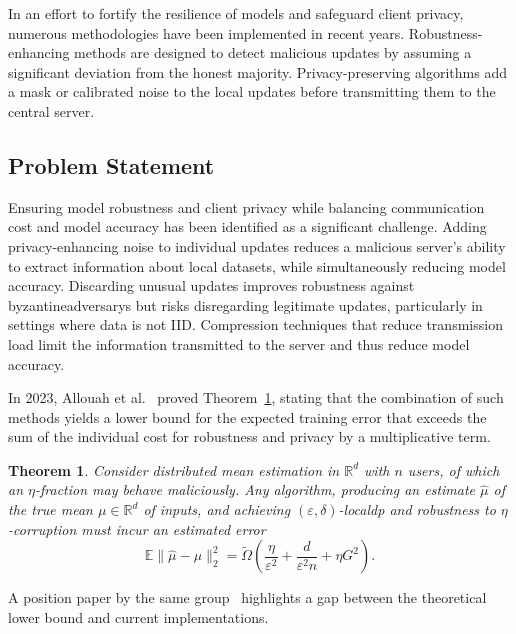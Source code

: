 \documentclass[11pt,twocolumn,a4paper,DIV=calc,parskip=half]{scrartcl}
\newtheorem{theorem}{Theorem}
\begin{document}
	In an effort to fortify the resilience of models and safeguard client privacy, numerous methodologies have been implemented in recent years. 
	Robustness-enhancing methods are designed to detect malicious updates by assuming a significant deviation from the honest majority. 
	Privacy-preserving algorithms add a mask or calibrated noise to the local updates before transmitting them to the central server.
	
	\subsection{Problem Statement}
	
	Ensuring model robustness and client privacy while balancing communication cost and model accuracy has been identified as a significant challenge.
	Adding privacy-enhancing noise to individual updates reduces a malicious server's ability to extract information about local datasets, while simultaneously reducing model accuracy.
	Discarding unusual updates improves robustness against \glspl{byzantineadversary} but risks disregarding legitimate updates, particularly in settings where data is not \ac{IID}.
	Compression techniques that reduce transmission load limit the information transmitted to the server and thus reduce model accuracy.
	
	In 2023, Allouah et al.~\cite{allouah2023trilemma} proved Theorem~\ref{theorem:lowerBound}, stating that the combination of such methods yields a lower bound for the expected training error that exceeds the sum of the individual cost for robustness and privacy by a multiplicative term.
	\begin{theorem}
		Consider distributed mean estimation in $\mathbb{R}^d$ with $n$ users, of which an $\eta$-fraction may behave maliciously. Any algorithm, producing an estimate $\hat{\mu}$ of the true mean $\mu\in\mathbb{R}^d$ of inputs, and achieving $(\varepsilon,\delta)$-\gls{localdp} and robustness to $\eta$-corruption must incur an estimated error
		\begin{equation}
			\mathbb{E}\parallel \hat{\mu}-\mu\parallel _{2}^{2} = \tilde{\Omega}(\frac{\eta}{\varepsilon^{2}}+\frac{d}{\varepsilon^{2}n}+\eta G^{2}).
		\end{equation}
		\label{theorem:lowerBound}
	\end{theorem}
	
	A position paper by the same group~\cite{allouah2023balancing} highlights a gap between the theoretical lower bound and current
	implementations. 
	
\end{document}
